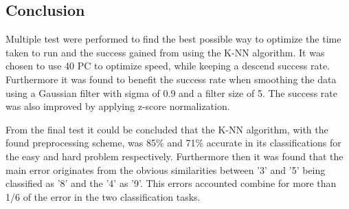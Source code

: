\subsection{Conclusion}



Multiple test were performed to find the best possible way to optimize the time taken to run and the success gained from using the K-NN algorithm.
It was chosen to use 40 PC to optimize speed, while keeping a descend success rate.
Furthermore it was found to benefit the success rate when smoothing the data using a Gaussian filter with sigma of 0.9 and a filter size of 5.
The success rate was also improved by applying z-score normalization.

From the final test it could be concluded that the K-NN algorithm, with the found preprocessing scheme, was 85\% and 71\% accurate in its classifications for the easy and hard problem respectively.
Furthermore then it was found that the main error originates from the obvious similarities between '3' and '5' being classified as '8' and the '4' as '9'.
This errors accounted combine for more than 1/6 of the error in the two classification tasks.